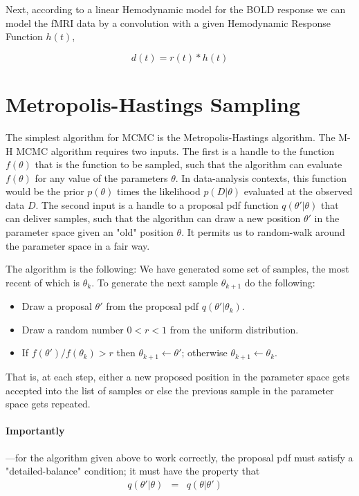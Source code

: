 \documentclass[review]{elsarticle}
\newcommand{\given}{|}
\newcommand{\pars}{\theta}
\begin{document}
Next, according to a linear Hemodynamic model for the BOLD response we can model the fMRI data by a convolution with a given Hemodynamic Response Function $h(t)$,

\begin{equation}
	d(t) = r(t) * h(t)
\end{equation}

\section{Metropolis-Hastings Sampling}
The simplest algorithm for MCMC is the Metropolis-Hastings algorithm\citep{Hastings1970}. The M-H MCMC algorithm requires two inputs. The first is a handle to the function $f(\pars)$ that is the function to be sampled, such that the algorithm can evaluate $f(\pars)$ for any value of the parameters $\pars$. In data-analysis contexts, this function would be
the prior $p(\pars)$ times the likelihood $p(D | \pars)$ evaluated at the observed data $D$. The second input is a handle to a proposal pdf function $q(\pars' | \pars)$ that can deliver samples, such that the algorithm can draw a new position $\pars'$ in the parameter space given an "old" position $\pars$. It permits us to random-walk around the parameter space in a fair way.

The algorithm is the following: We have generated some set of samples, the most
recent of which is $\pars_k$. To generate the next sample $\pars_{k+1}$ do the following:
\begin{itemize}
	\item Draw a proposal $\pars'$ from the proposal pdf $q(\pars'|\pars_k)$.
	\item Draw a random number $0<r<1$ from the uniform distribution.
	\item If $f(\pars') / f(\pars_k) > r$ then $\pars_{k+1} \leftarrow \pars'$;
	otherwise $\pars_{k+1} \leftarrow \pars_k$.
\end{itemize}

That is, at each step, either a new proposed position in the parameter space gets
accepted into the list of samples or else the previous sample in the parameter space
gets repeated.

\paragraph{Importantly}—for the algorithm given above to work correctly, the proposal pdf must satisfy a "detailed-balance" condition; it must have the property that
\begin{eqnarray}
q(\pars'\given\pars) &=& q(\pars\given\pars')
\label{eq:detailed-balance}\quad
\end{eqnarray}
\end{document}

